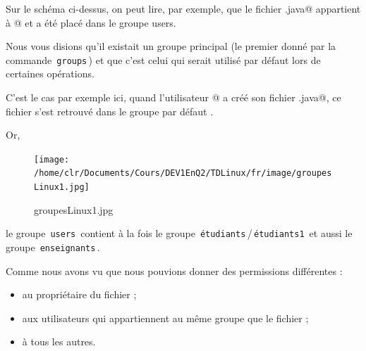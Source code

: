 \documentclass[11pt,a4paper]{article}
\begin{document}
          Sur le sch\'ema ci-dessus, on peut lire, par exemple, que le fichier \verb@Max.java@ 
          appartient \`a @ et a \'et\'e plac\'e dans le groupe users.
        
            \par
        
          Nous vous disions qu'il existait un groupe principal (le premier donn\'e par la commande \,\verb|groups|\,)
          et que c'est celui qui serait utilis\'e par d\'efaut lors de certaines op\'erations.
        
            \par
        
          C'est le cas par exemple ici,
          quand l'utilisateur @ a cr\'e\'e son fichier \verb@Max.java@,
          ce fichier s'est retrouv\'e dans le groupe par d\'efaut \verb@users@.
        
            \par
        
          Or, 
        
            \par
        \begin{figure}[hbt]
				    \begin{center}
					\texttt{[image: /home/clr/Documents/Cours/DEV1EnQ2/TDLinux/fr/image/groupesLinux1.jpg]}
						\end{center}
                
                    \caption[groupesLinux1.jpg]{groupesLinux1.jpg}
                \end{figure}
                    
            \par
        
          le groupe \,\verb|users|\, contient \`a la fois 
          le groupe \,\verb|étudiants|\,/\,\verb|étudiants1|\, et
          aussi le groupe \,\verb|enseignants|\,.
        
            \par
        
					Comme nous avons vu que nous pouvions donner des permissions diff\'erentes :
					
					\begin{itemize}
				
			\item au propri\'etaire du fichier ;
			\item aux utilisateurs qui appartiennent au m\^eme groupe que le fichier ;
			\item  \`a tous les autres. 
					\end{itemize}
				
\end{document}
